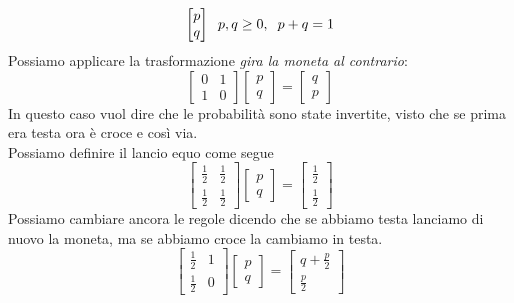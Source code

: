 \documentclass{article}
\begin{document}
    $$
        \begin{bmatrix}
            p \\ q
        \end{bmatrix}
        \hspace{0.2cm}
        p,q \ge0 , \hspace{0.2cm}
        p+q = 1
    $$
    Possiamo applicare la trasformazione \textit{gira la moneta al contrario}:
    $$
        \begin{bmatrix}
            0 & 1 \\ 1 & 0 
        \end{bmatrix}
        \begin{bmatrix}
            p \\ q
        \end{bmatrix}
        = 
        \begin{bmatrix}
            q \\ p
        \end{bmatrix}
    $$
    In questo caso vuol dire che le probabilità sono state invertite, visto che se prima era testa ora è croce e così via.
    \\Possiamo definire il lancio equo come segue
    $$
        \begin{bmatrix}
            \frac{1}{2} & \frac{1}{2}
            \\ \frac{1}{2} & \frac{1}{2} 
        \end{bmatrix}
        \begin{bmatrix}
            p \\ q
        \end{bmatrix}
        = 
        \begin{bmatrix}
            \frac{1}{2}
            \\\frac{1}{2}
        \end{bmatrix}
    $$
    Possiamo cambiare ancora le regole dicendo che se abbiamo testa lanciamo di nuovo la moneta, ma se abbiamo croce la cambiamo in testa.
    $$
        \begin{bmatrix}
            \frac{1}{2} & 1
            \\ \frac{1}{2} & 0 
        \end{bmatrix}
        \begin{bmatrix}
            p \\ q
        \end{bmatrix}
        = 
        \begin{bmatrix}
            q+\frac{p}{2}
            \\\frac{p}{2}
        \end{bmatrix}
    $$
\end{document}

